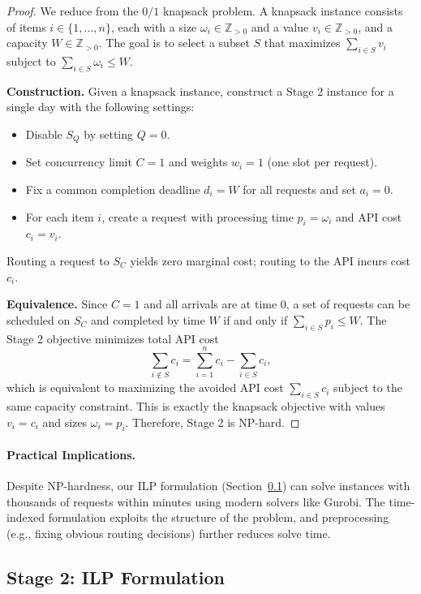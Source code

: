 \begin{proof}
We reduce from the $0/1$ knapsack problem. A knapsack instance consists of items
$i \in \{1,\dots,n\}$, each with a size $\omega_i \in \mathbb{Z}_{>0}$ and a value
$v_i \in \mathbb{Z}_{>0}$, and a capacity $W \in \mathbb{Z}_{>0}$. The goal is to select
a subset $S$ that maximizes $\sum_{i \in S} v_i$ subject to $\sum_{i \in S} \omega_i \le W$.

\textbf{Construction.} Given a knapsack instance, construct a Stage 2 instance for a single day
with the following settings:
\begin{itemize}
    \item Disable $S_Q$ by setting $Q=0$.
    \item Set concurrency limit $C=1$ and weights $w_i=1$ (one slot per request).
    \item Fix a common completion deadline $d_i = W$ for all requests and set $a_i=0$.
    \item For each item $i$, create a request with processing time $p_i = \omega_i$ and API cost
          $c_i = v_i$.
\end{itemize}
Routing a request to $S_C$ yields zero marginal cost; routing to the API incurs cost $c_i$.

\textbf{Equivalence.} Since $C=1$ and all arrivals are at time $0$, a set of requests can be
scheduled on $S_C$ and completed by time $W$ if and only if
$\sum_{i \in S} p_i \le W$. The Stage 2 objective minimizes total API cost
\[
\sum_{i \notin S} c_i = \sum_{i=1}^n c_i - \sum_{i \in S} c_i,
\]
which is equivalent to maximizing the avoided API cost $\sum_{i \in S} c_i$ subject to the
same capacity constraint. This is exactly the knapsack objective with values $v_i=c_i$ and
sizes $\omega_i=p_i$. Therefore, Stage 2 is NP-hard.
\end{proof}

\paragraph{Practical Implications.} Despite NP-hardness, our ILP formulation (Section~\ref{app:stage2_ilp}) can solve instances with thousands of requests within minutes using modern solvers like Gurobi. The time-indexed formulation exploits the structure of the problem, and preprocessing (e.g., fixing obvious routing decisions) further reduces solve time.

\subsection{Stage 2: ILP Formulation}
\label{app:stage2_ilp}

